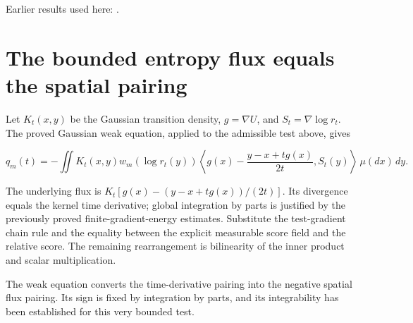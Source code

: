\documentclass[11pt,a4paper]{article}
\begin{document}
Earlier results used here: \cite[Section~3.26.3]{LangevinLean2026ULASC}.

\section{\texorpdfstring{The bounded entropy flux equals the spatial pairing}{The bounded entropy flux equals the spatial pairing}}


Let \(K_t(x,y)\) be the Gaussian transition density, \(g=\nabla U\), and \(S_t=\nabla\log r_t\). The proved Gaussian weak equation, applied to the admissible test above, gives

\[q_m(t)=-\iint K_t(x,y)w_m(\log r_t(y))\left\langle g(x)-\frac{y-x+tg(x)}{2t},S_t(y)\right\rangle\,\mu(dx)\,dy.\]

The underlying flux is \(K_t[g(x)-(y-x+tg(x))/(2t)]\). Its divergence equals the kernel time derivative; global integration by parts is justified by the previously proved finite-gradient-energy estimates. Substitute the test-gradient chain rule and the equality between the explicit measurable score field and the relative score. The remaining rearrangement is bilinearity of the inner product and scalar multiplication.



The weak equation converts the time-derivative pairing into the negative spatial flux pairing. Its sign is fixed by integration by parts, and its integrability has been established for this very bounded test.
\end{document}
